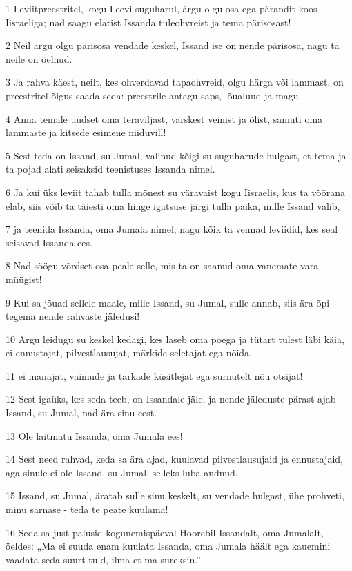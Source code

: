 \par 1 Leviitpreestritel, kogu Leevi suguharul, ärgu olgu osa ega pärandit koos Iisraeliga; nad saagu elatist Issanda tuleohvreist ja tema pärisosast!
\par 2 Neil ärgu olgu pärisosa vendade keskel, Issand ise on nende pärisosa, nagu ta neile on öelnud.
\par 3 Ja rahva käest, neilt, kes ohverdavad tapaohvreid, olgu härga või lammast, on preestritel õigus saada seda: preestrile antagu saps, lõualuud ja magu.
\par 4 Anna temale uudset oma teraviljast, värskest veinist ja õlist, samuti oma lammaste ja kitsede esimene niiduvill!
\par 5 Sest teda on Issand, su Jumal, valinud kõigi su suguharude hulgast, et tema ja ta pojad alati seisaksid teenistuses Issanda nimel.
\par 6 Ja kui üks leviit tahab tulla mõnest su väravaist kogu Iisraelis, kus ta võõrana elab, siis võib ta täiesti oma hinge igatsuse järgi tulla paika, mille Issand valib,
\par 7 ja teenida Issanda, oma Jumala nimel, nagu kõik ta vennad leviidid, kes seal seisavad Issanda ees.
\par 8 Nad söögu võrdset osa peale selle, mis ta on saanud oma vanemate vara müügist!
\par 9 Kui sa jõuad sellele maale, mille Issand, su Jumal, sulle annab, siis ära õpi tegema nende rahvaste jäledusi!
\par 10 Ärgu leidugu su keskel kedagi, kes laseb oma poega ja tütart tulest läbi käia, ei ennustajat, pilvestlausujat, märkide seletajat ega nõida,
\par 11 ei manajat, vaimude ja tarkade küsitlejat ega surnutelt nõu otsijat!
\par 12 Sest igaüks, kes seda teeb, on Issandale jäle, ja nende jäleduste pärast ajab Issand, su Jumal, nad ära sinu eest.
\par 13 Ole laitmatu Issanda, oma Jumala ees!
\par 14 Sest need rahvad, keda sa ära ajad, kuulavad pilvestlausujaid ja ennustajaid, aga sinule ei ole Issand, su Jumal, selleks luba andnud.
\par 15 Issand, su Jumal, äratab sulle sinu keskelt, su vendade hulgast, ühe prohveti, minu sarnase - teda te peate kuulama!
\par 16 Seda sa just palusid kogunemispäeval Hoorebil Issandalt, oma Jumalalt, öeldes: „Ma ei suuda enam kuulata Issanda, oma Jumala häält ega kauemini vaadata seda suurt tuld, ilma et ma sureksin.”
